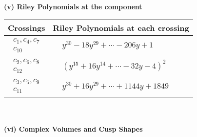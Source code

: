 \documentclass[1p]{elsarticle_modified}
\theoremstyle{definition}
\begin{document}
\newpage\renewcommand{\arraystretch}{1}
\flushleft \textbf{(v) Riley Polynomials at the component}\newline \\
\begin{tabular}{m{50pt}|m{274pt}}
Crossings & \hspace{64pt}Riley Polynomials at each crossing \\
\hline $$\begin{aligned}c_{1},c_{4},c_{7}\\c_{10}\end{aligned}$$&$\begin{aligned}
&y^{30}-18 y^{29}+\cdots-206 y+1
\end{aligned}$\\
\hline $$\begin{aligned}c_{2},c_{6},c_{8}\\c_{12}\end{aligned}$$&$\begin{aligned}
&(y^{15}+16 y^{14}+\cdots-32 y-4)^{2}
\end{aligned}$\\
\hline $$\begin{aligned}c_{3},c_{5},c_{9}\\c_{11}\end{aligned}$$&$\begin{aligned}
&y^{30}+16 y^{29}+\cdots+1144 y+1849
\end{aligned}$\\
\hline
\end{tabular}\\~\\
\newpage\flushleft \textbf{(vi) Complex Volumes and Cusp Shapes}
\end{document}
